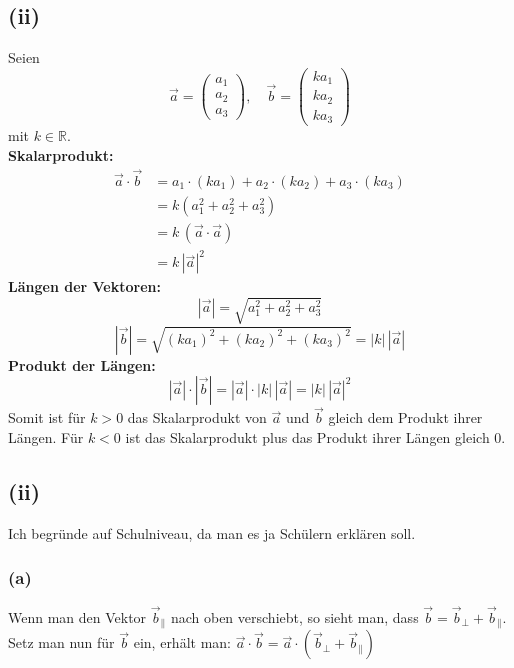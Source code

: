 \documentclass[12pt,a4paper]{article}
\begin{document}
\subsection*{(ii)}
Seien  
\[ 
\vec{a} = \begin{pmatrix} a_1 \\ a_2 \\ a_3 \end{pmatrix}, \quad 
\vec{b} = \begin{pmatrix} k a_1 \\ k a_2 \\ k a_3 \end{pmatrix} 
\] 
mit $k \in \mathbb{R}$.\\
\textbf{Skalarprodukt:} 
\begin{align*}
    \vec{a} \cdot \vec{b}  &= a_1 \cdot (k a_1) + a_2 \cdot (k a_2) + a_3 \cdot (k a_3) \\
                           &= k (a_1^2 + a_2^2 + a_3^2) \\
                           &= k \, (\vec{a} \cdot \vec{a}) \\
                           &= k \, |\vec{a}|^2 
\end{align*}
\textbf{Längen der Vektoren:} 
\[ 
|\vec{a}| = \sqrt{a_1^2 + a_2^2 + a_3^2} 
\] 
\[ 
|\vec{b}| = \sqrt{(k a_1)^2 + (k a_2)^2 + (k a_3)^2} = |k|\,|\vec{a}| 
\]
\textbf{Produkt der Längen:} 
\[
|\vec{a}| \cdot |\vec{b}| = |\vec{a}| \cdot |k|\,|\vec{a}| = |k|\,|\vec{a}|^2 
\]
Somit ist für $k>0$ das Skalarprodukt von $\vec{a}$ und $\vec{b}$ gleich dem Produkt ihrer Längen. Für $k<0$ ist das Skalarprodukt plus das Produkt ihrer Längen gleich 0.

\newpage
\subsection*{(ii)}
Ich begründe auf Schulniveau, da man es ja Schülern erklären soll.
\subsubsection*{(a)}
Wenn man den Vektor $\vec{b}_{\parallel}$ nach oben verschiebt, so sieht man, dass $\vec{b} = \vec{b}_{\perp} + \vec{b}_{\parallel}$. Setz man nun für $\vec{b}$ ein, erhält man: $\vec{a} \cdot \vec{b} = \vec{a} \cdot (\vec{b}_{\perp} + \vec{b}_{\parallel})$
\end{document}
